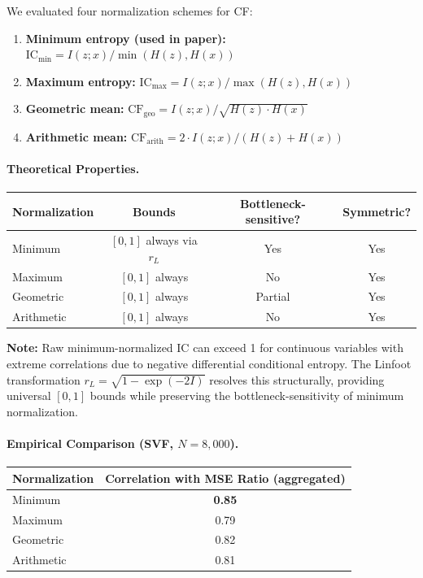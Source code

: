 \documentclass[10pt]{article} %
\theoremstyle{plain}
\theoremstyle{definition}
\newcommand{\IC}{\mathrm{IC}}  %
\begin{document}
We evaluated four normalization schemes for CF:

\begin{enumerate}
    \item \textbf{Minimum entropy (used in paper):} $\IC_{\min} = I(z;x) / \min(H(z), H(x))$
    \item \textbf{Maximum entropy:} $\IC_{\max} = I(z;x) / \max(H(z), H(x))$
    \item \textbf{Geometric mean:} $\text{CF}_{\text{geo}} = I(z;x) / \sqrt{H(z) \cdot H(x)}$
    \item \textbf{Arithmetic mean:} $\text{CF}_{\text{arith}} = 2 \cdot I(z;x) / (H(z) + H(x))$
\end{enumerate}

\paragraph{Theoretical Properties.}

\begin{center}
\begin{tabular}{lccc}
\toprule
Normalization & Bounds & Bottleneck-sensitive? & Symmetric? \\
\midrule
Minimum & $[0, 1]$ always via $r_L$ & Yes & Yes \\
Maximum & $[0, 1]$ always & No & Yes \\
Geometric & $[0, 1]$ always & Partial & Yes \\
Arithmetic & $[0, 1]$ always & No & Yes \\
\bottomrule
\end{tabular}
\end{center}

\noindent\textbf{Note:} Raw minimum-normalized IC can exceed 1 for continuous variables with extreme correlations due to negative differential conditional entropy. The Linfoot transformation $r_L = \sqrt{1 - \exp(-2I)}$ resolves this structurally, providing universal $[0,1]$ bounds while preserving the bottleneck-sensitivity of minimum normalization.

\paragraph{Empirical Comparison (SVF, $N=8{,}000$).}

\begin{center}
\begin{tabular}{lc}
\toprule
Normalization & Correlation with MSE Ratio (aggregated) \\
\midrule
Minimum & \textbf{0.85} \\
Maximum & 0.79 \\
Geometric & 0.82 \\
Arithmetic & 0.81 \\
\bottomrule
\end{tabular}
\end{center}
\end{document}
